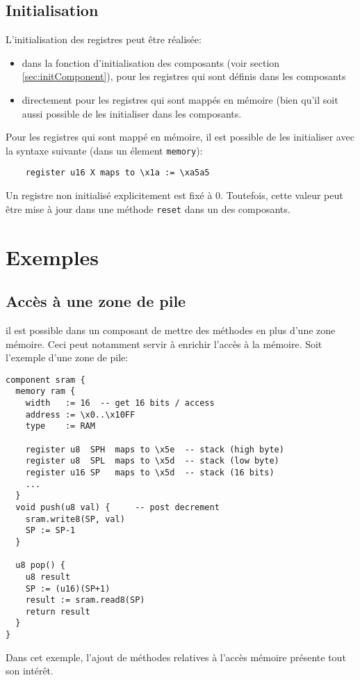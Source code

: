 \subsection{Initialisation}
L'initialisation des registres peut être réalisée:
\begin{itemize}
\item dans la fonction d'initialisation des composants (voir section \ref{sec:initComponent}), pour les registres qui sont définis dans les composants
\item directement pour les registres qui sont mappés en mémoire (bien qu'il soit aussi possible de les initialiser dans les composants.
\end{itemize}
Pour les registres qui sont mappé en mémoire, il est possible de les initialiser avec la syntaxe suivante (dans un élement \texttt{memory}):
\begin{lstlisting}
    register u16 X maps to \x1a := \xa5a5
\end{lstlisting}

Un registre non initialisé explicitement est fixé à 0. Toutefois, cette valeur peut être mise à jour dans une méthode \texttt{reset} dans un des composants.

\section{Exemples}
\subsection{Accès à une zone de pile}
il est possible dans un composant de mettre des méthodes en plus d'une zone mémoire. Ceci peut notamment servir à enrichir l'accès à la mémoire. Soit l'exemple d'une zone de pile:
\begin{lstlisting}
component sram {
  memory ram {
    width   := 16  -- get 16 bits / access
    address := \x0..\x10FF 
    type    := RAM 

    register u8  SPH  maps to \x5e  -- stack (high byte)
    register u8  SPL  maps to \x5d  -- stack (low byte)
    register u16 SP   maps to \x5d  -- stack (16 bits)
    ...
  }
  void push(u8 val) {     -- post decrement
    sram.write8(SP, val) 
    SP := SP-1 
  }

  u8 pop() {
    u8 result 
    SP := (u16)(SP+1) 
    result := sram.read8(SP) 
    return result 
  }
}
\end{lstlisting}
Dans cet exemple, l'ajout de méthodes relatives à l'accès mémoire présente tout son intérêt.


